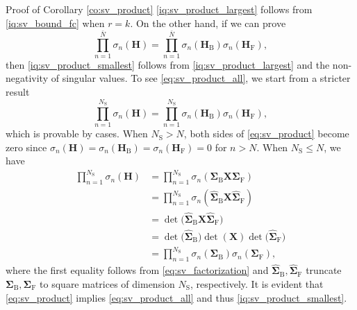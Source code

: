 \documentclass[journal]{IEEEtran}
\begin{document}
\begin{appendix}
	\begin{subsection}{Proof of Corollary \ref{co:sv_product}}\label{ap:sv_product}
		\eqref{iq:sv_product_largest} follows from \eqref{iq:sv_bound_fc} when $r = k$.
		On the other hand, if we can prove
		\begin{equation}
			\prod_{n=1}^{\bar{N}} \sigma_n(\mathbf{H}) = \prod_{n=1}^{\bar{N}} \sigma_n(\mathbf{H}_\mathrm{B}) \sigma_n(\mathbf{H}_\mathrm{F}),
			\label{eq:sv_product_all}
		\end{equation}
		then \eqref{iq:sv_product_smallest} follows from \eqref{iq:sv_product_largest} and the non-negativity of singular values.
		To see \eqref{eq:sv_product_all}, we start from a stricter result
		\begin{equation}
			\prod_{n=1}^{N_\mathrm{S}} \sigma_n(\mathbf{H}) = \prod_{n=1}^{N_\mathrm{S}} \sigma_n(\mathbf{H}_\mathrm{B}) \sigma_n(\mathbf{H}_\mathrm{F}),
			\label{eq:sv_product}
		\end{equation}
		which is provable by cases.
		When $N_\mathrm{S} > N$, both sides of \eqref{eq:sv_product} become zero since $\sigma_n(\mathbf{H}) = \sigma_n(\mathbf{H}_\mathrm{B}) = \sigma_n(\mathbf{H}_\mathrm{F}) = 0$ for $n > N$.
		When $N_\mathrm{S} \le N$, we have
		\begin{equation*}
			\begin{split}
				\prod\nolimits_{n=1}^{N_\mathrm{S}} \sigma_n(\mathbf{H})
				& = \prod\nolimits_{n=1}^{N_\mathrm{S}} \sigma_n(\mathbf{\Sigma}_\mathrm{B} \mathbf{X} \mathbf{\Sigma}_\mathrm{F}) \\
				& = \prod\nolimits_{n=1}^{N_\mathrm{S}} \sigma_n(\hat{\mathbf{\Sigma}}_\mathrm{B} \mathbf{X} \hat{\mathbf{\Sigma}}_\mathrm{F}) \\
				& = \det\bigl(\hat{\mathbf{\Sigma}}_\mathrm{B} \mathbf{X} \hat{\mathbf{\Sigma}}_\mathrm{F}\bigr) \\
				& = \det\bigl(\hat{\mathbf{\Sigma}}_\mathrm{B}\bigr) \det(\mathbf{X}) \det\bigl(\hat{\mathbf{\Sigma}}_\mathrm{F}\bigr) \\
				& = \prod\nolimits_{n=1}^{N_\mathrm{S}} \sigma_n(\mathbf{\Sigma}_\mathrm{B}) \sigma_n(\mathbf{\Sigma}_\mathrm{F}),
			\end{split}
		\end{equation*}
		where the first equality follows from \eqref{eq:sv_factorization} and $\hat{\mathbf{\Sigma}}_\mathrm{B}, \hat{\mathbf{\Sigma}}_\mathrm{F}$ truncate $\mathbf{\Sigma}_\mathrm{B}, \mathbf{\Sigma}_\mathrm{F}$ to square matrices of dimension $N_\mathrm{S}$, respectively.
		It is evident that \eqref{eq:sv_product} implies \eqref{eq:sv_product_all} and thus \eqref{iq:sv_product_smallest}.
	\end{subsection}


\end{appendix}
\end{document}

